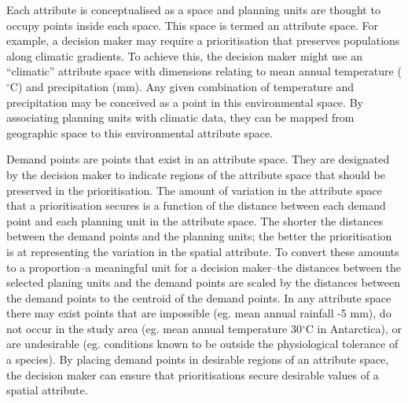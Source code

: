 \documentclass[11pt,]{article}
\begin{document}
Each attribute is conceptualised as a space and planning units are
thought to occupy points inside each space. This space is termed an
attribute space. For example, a decision maker may require a
prioritisation that preserves populations along climatic gradients. To
achieve this, the decision maker might use an ``climatic'' attribute
space with dimensions relating to mean annual temperature ($^{\circ}$C)
and precipitation (mm). Any given combination of temperature and
precipitation may be conceived as a point in this environmental space.
By associating planning units with climatic data, they can be mapped
from geographic space to this environmental attribute space.

Demand points are points that exist in an attribute space. They are
designated by the decision maker to indicate regions of the attribute
space that should be preserved in the prioritisation. The amount of
variation in the attribute space that a prioritisation secures is a
function of the distance between each demand point and each planning
unit in the attribute space. The shorter the distances between the
demand points and the planning units; the better the prioritisation is
at representing the variation in the spatial attribute. To convert these
amounts to a proportion--a meaningful unit for a decision maker--the
distances between the selected planing units and the demand points are
scaled by the distances between the demand points to the centroid of the
demand points. In any attribute space there may exist points that are
impossible (eg. mean annual rainfall -5 mm), do not occur in the study
area (eg. mean annual temperature 30$^{\circ}$C in Antarctica), or are
undesirable (eg. conditions known to be outside the physiological
tolerance of a species). By placing demand points in desirable regions
of an attribute space, the decision maker can ensure that
prioritisations secure desirable values of a spatial attribute.
\end{document}
